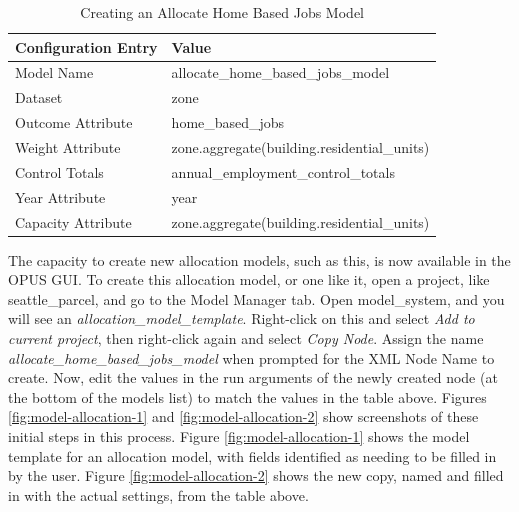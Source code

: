 \begin{table}[htp]
\caption{Creating an Allocate Home Based Jobs Model}
\label{tab:allocation-model}
\begin{center}
\begin{tabular}{ p{1.5in}  p{4.4in}  }
\toprule[1.5pt]
Configuration Entry & Value \\
\midrule
Model Name & allocate\_home\_based\_jobs\_model \\
Dataset & zone \\
Outcome Attribute & home\_based\_jobs \\
Weight Attribute & zone.aggregate(building.residential\_units) \\
Control Totals & annual\_employment\_control\_totals \\
Year Attribute & year \\
Capacity Attribute & zone.aggregate(building.residential\_units) \\
\bottomrule
\end{tabular}
\end{center}
\end{table}

The capacity to create new allocation models, such as this, is now available in the OPUS GUI.  To create this allocation model, or one like it, open a project, like seattle\_parcel, and go to the Model Manager tab.  Open model\_system, and you will see an \emph{allocation\_model\_template}.  Right-click on this and select \emph{Add to current project}, then right-click again and select \emph{Copy Node}.  Assign the name \emph{allocate\_home\_based\_jobs\_model} when prompted for the XML Node Name to create.  Now, edit the values in the run arguments of the newly created node (at the bottom of the models list) to match the values in the table above. Figures \ref{fig:model-allocation-1} and \ref{fig:model-allocation-2} show screenshots of these initial steps in this process.  Figure \ref{fig:model-allocation-1} shows the model template for an allocation model, with fields identified as needing to be filled in by the user. Figure \ref{fig:model-allocation-2} shows the new copy, named and filled in with the actual settings, from the table above. 


